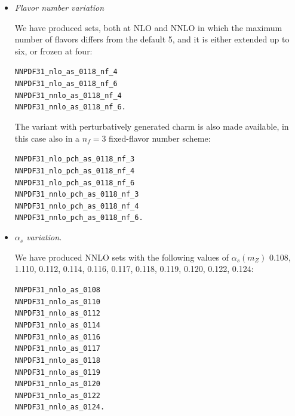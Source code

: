 \begin{itemize}
\item {\it Flavor number variation}

We have produced sets, both at NLO and NNLO 
in which the maximum number of flavors differs
from the default 5, and it is either extended up to six, or frozen at
four:
\begin{flushleft}
  \tt NNPDF31\_nlo\_as\_0118\_nf\_4 \\
  \tt NNPDF31\_nlo\_as\_0118\_nf\_6 \\
  \tt NNPDF31\_nnlo\_as\_0118\_nf\_4 \\
  \tt NNPDF31\_nnlo\_as\_0118\_nf\_6. \\
\end{flushleft}
The variant with perturbatively generated charm is also made
available, in this case also in a $n_f=3$ fixed-flavor number scheme:
\begin{flushleft}
  \tt NNPDF31\_nlo\_pch\_as\_0118\_nf\_3 \\
  \tt NNPDF31\_nlo\_pch\_as\_0118\_nf\_4 \\
  \tt NNPDF31\_nlo\_pch\_as\_0118\_nf\_6 \\
  \tt NNPDF31\_nnlo\_pch\_as\_0118\_nf\_3 \\
  \tt NNPDF31\_nnlo\_pch\_as\_0118\_nf\_4 \\
  \tt NNPDF31\_nnlo\_pch\_as\_0118\_nf\_6. \\
\end{flushleft}




\item {\it $\alpha_s$ variation.}

We have produced NNLO sets with the following values of $\alpha_s(m_Z)$
0.108, 1.110, 0.112, 0.114, 0.116, 0.117, 0.118, 0.119, 0.120, 0.122,
0.124:
\begin{flushleft}
  \tt NNPDF31\_nnlo\_as\_0108 \\
  \tt NNPDF31\_nnlo\_as\_0110 \\
  \tt NNPDF31\_nnlo\_as\_0112 \\
  \tt NNPDF31\_nnlo\_as\_0114 \\
  \tt NNPDF31\_nnlo\_as\_0116 \\
  \tt NNPDF31\_nnlo\_as\_0117 \\
  \tt NNPDF31\_nnlo\_as\_0118 \\
  \tt NNPDF31\_nnlo\_as\_0119 \\
  \tt NNPDF31\_nnlo\_as\_0120 \\
  \tt NNPDF31\_nnlo\_as\_0122 \\
  \tt NNPDF31\_nnlo\_as\_0124. \\
\end{flushleft}


\end{itemize}
